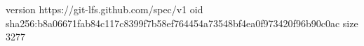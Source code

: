 version https://git-lfs.github.com/spec/v1
oid sha256:b8a06671fab84c117c8399f7b58ef764454a73548bf4ea0f973420f96b90c0ac
size 3277
